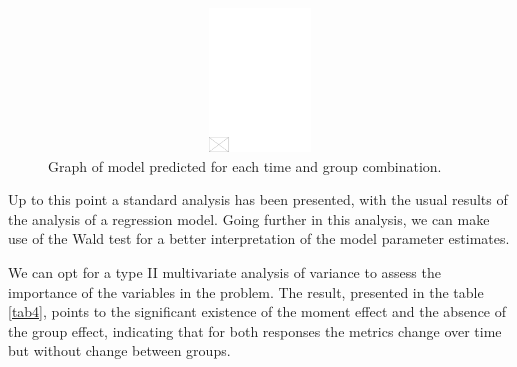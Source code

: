 \documentclass[AMA,STIX1COL]{WileyNJD-v2}
\begin{document}
\begin{figure}[h]
\centerline{\includegraphics[width=342pt,height=9pc,draft]{empty}}
\caption{Graph of model predicted for each time and group combination.\label{fig6}}
\end{figure}

  
Up to this point a standard analysis has been presented, with the usual results of the analysis of a regression model. Going further in this analysis, we can make use of the Wald test for a better interpretation of the model parameter estimates.

We can opt for a type II multivariate analysis of variance to assess the importance of the variables in the problem. The result, presented in the table \autoref{tab4}, points to the significant existence of the moment effect and the absence of the group effect, indicating that for both responses the metrics change over time but without change between groups.
\end{document}
